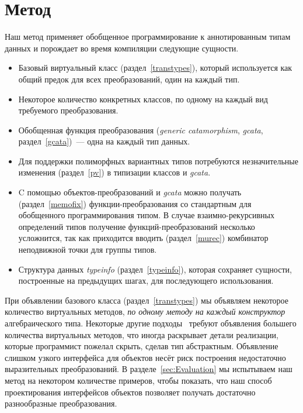 \section{Метод}
\label{sec:implementation}

Наш метод применяет обобщенное программирование к аннотированным  типам данных и порождает во время компиляции следующие сущности.

\begin{itemize}
\item Базовый виртуальный класс (раздел~\ref{transtypes}), который используется как общий предок для всех преобразований, один на каждый тип. 

\item Некоторое количество конкретных классов, по одному на каждый вид требуемого преобразования.

\item Обобщенная функция преобразования (\emph{generic catamorphism}, \emph{gcata}, раздел~\ref{gcata})~--- одна на каждый тип данных. 

\item Для поддержки полиморфных вариантных типов потребуются незначительные изменения (раздел~\ref{pv}) в типизации классов и \emph{gcata}.

\item C помощью объектов-преобразований и \emph{gcata} можно получать (раздел~\ref{memofix}) функции-преобразования со стандартным для обобщенного программирования типом. В случае взаимно-рекурсивных определений типов получение функций-преобразований несколько усложнится, так как приходится вводить (раздел~\ref{murec}) комбинатор неподвижной точки для группы типов.

\item Структура данных \emph{typeinfo} (раздел~\ref{typeinfo}), которая сохраняет сущности, построенные на предыдущих шагах, для последующего использования.
\end{itemize}


При объявлении базового класса (раздел~\ref{transtypes})
мы объявляем некоторое количество виртуальных методов, \textit{по одному методу на каждый конструктор} алгебраического типа. Некоторые другие подходы~\cite{Visitors} требуют объявления большего количества виртуальных методов, что иногда 
раскрывает детали реализации, которые 
программист пожелал скрыть, сделав тип абстрактным. Объявление слишком узкого интерфейса для объектов несёт риск построения недостаточно выразительных преобразований. В разделе~\ref{sec:Evaluation} мы испытываем наш метод на некотором количестве примеров, чтобы показать, что наш способ проектирования интерфейсов объектов позволяет получать достаточно разнообразные преобразования.


